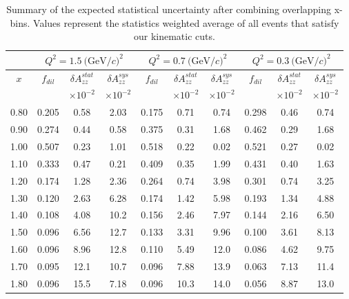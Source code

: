 \begin{table}
\begin{center}
\begin{tabular}{c|ccc|ccc|ccc}
 ~ & \multicolumn{3}{|c}{$Q^2=1.5\mathrm{~(GeV/}c)^2$} & \multicolumn{3}{|c}{$Q^2=0.7\mathrm{~(GeV/}c)^2$} & \multicolumn{3}{|c}{$Q^2=0.3\mathrm{~(GeV/}c)^2$} \\
 \hline
  $x$  & $f_{dil}$ & $\delta A_{zz}^{stat}$ & $\delta A_{zz}^{sys}$ & $f_{dil}$ & $\delta A_{zz}^{stat}$ & $\delta A_{zz}^{sys}$ & $f_{dil}$ & $\delta A_{zz}^{stat}$ & $\delta A_{zz}^{sys}$ \\
  &     & $\times 10^{-2}$  & $\times 10^{-2}$  &    & $\times 10^{-2}$  & $\times 10^{-2}$ &    & $\times 10^{-2}$  & $\times 10^{-2}$ \\
\hline\hline
 0.80	&  0.205	 & 0.58	& 2.03	& 0.175	 & 0.71	& 0.74 & 0.298 & 0.46 & 0.74 \\
 0.90	&  0.274	 & 0.44	& 0.58 	& 0.375	 & 0.31	& 1.68 & 0.462 & 0.29 & 1.68 \\
 1.00	&  0.507	 & 0.23	& 1.01 	& 0.518	 & 0.22	& 0.02 & 0.521 & 0.27 & 0.02 \\
 1.10	&  0.333	 & 0.47	& 0.21 	& 0.409	 & 0.35	& 1.99 & 0.431 & 0.40 & 1.63 \\
 1.20	&  0.174	 & 1.28	& 2.36 	& 0.264	 & 0.74	& 3.98 & 0.301 & 0.74 & 3.25 \\
 1.30	&  0.120	 & 2.63	& 6.28 	& 0.174	 & 1.42	& 5.98 & 0.193 & 1.34 & 4.88 \\
 1.40	&  0.108	 & 4.08	& 10.2 	& 0.156	 & 2.46	& 7.97 & 0.144 & 2.16 & 6.50 \\
 1.50	&  0.096	 & 6.56	& 12.7	& 0.133	 & 3.31	& 9.96 & 0.100 & 3.61 & 8.13 \\
 1.60	&  0.096	 & 8.96	& 12.8 	& 0.110	 & 5.49	& 12.0 & 0.086 & 4.62 & 9.75 \\
 1.70	&  0.095	 & 12.1	& 10.7 	& 0.096	 & 7.88	& 13.9 & 0.063 & 7.13 & 11.4 \\
 1.80	&  0.096	 & 15.5	& 7.18 	& 0.096	 & 10.3	& 14.0 & 0.056 & 8.87 & 13.0 \\
\hline\hline
\end{tabular}
\caption{\label{RATES2}Summary of the expected statistical uncertainty after combining overlapping x-bins.  Values represent the statistics weighted average of all events that satisfy our kinematic cuts. }
\end{center}
\end{table}


